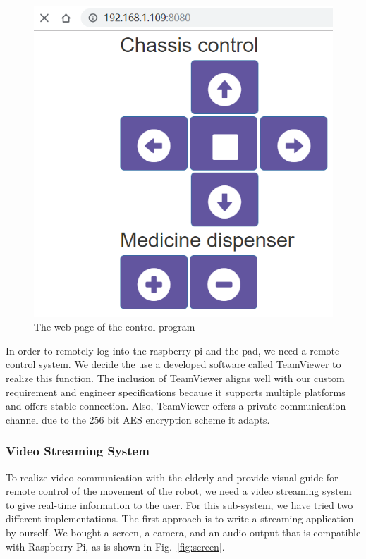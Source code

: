 \documentclass[12pt]{article}
\begin{document}
\begin{figure}[tbph!]
	\centering
	\includegraphics[width=0.5\linewidth]{gui}
	\caption{The web page of the control program}
	\label{fig:gui}
\end{figure}
In order to remotely log into the raspberry pi and the pad, we need a remote control system. We decide the use a developed software called TeamViewer to realize this function. The inclusion of TeamViewer aligns well with our custom requirement and engineer specifications because it supports multiple platforms and offers stable connection. Also, TeamViewer offers a private communication channel due to the 256 bit AES encryption scheme it adapts.
\subsubsection{Video Streaming System}
To realize video communication with the elderly and provide visual guide for remote control of the movement of the robot, we need a video streaming system to give real-time information to the user.
For this sub-system, we have tried two different implementations. The first approach is to write a streaming application by ourself. We bought a screen, a camera, and an audio output that is compatible with Raspberry Pi, as is shown in
Fig.~\ref{fig:screen}.
\end{document}
